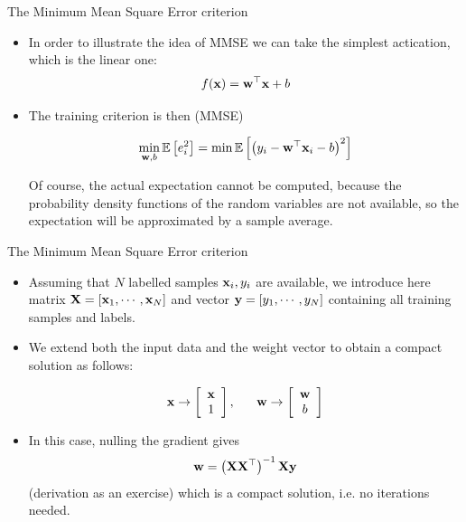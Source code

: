 \documentclass{beamer}
\begin{document}
\begin{frame}{The Minimum Mean Square Error criterion}

\begin{itemize}
    \item In order to illustrate the idea of MMSE we can take the simplest actication, which is the linear one:
    $$
    f({\bf x}) = {\bf w}^\top {\bf x} + b
    $$
    
    \item The training criterion is then (MMSE)
    
    \begin{equation}
    \min_{{\bf w}, b} \mathbb{E}\left[e_i^2\right] = \min \mathbb{E} \left[ \left( y_i - {\bf w}^\top {\bf x}_i -b \right)^2\right]
    \end{equation}

Of course, the actual expectation cannot be computed, because the probability density functions of the random variables are not available, so the expectation will be approximated by a sample average. 

\end{itemize}
\end{frame}

\begin{frame}{The Minimum Mean Square Error criterion}

\begin{itemize}
\item Assuming that $N$ labelled samples ${\bf x}_i, y_i$ are available, we introduce here matrix ${\bf X} = \left[{\bf x}_1, \cdots, {\bf x}_N\right]$ and vector ${\bf y} = \left[y_1, \cdots, y_N\right] $ containing all training samples and labels. 

\item We extend both the input data and the weight vector to obtain a compact solution as follows:

$$
{\bf x} \rightarrow \left[
\begin{array}{c}
     {\bf x}  \\
     1 
\end{array}
\right],~~~~~
{\bf w} \rightarrow \left[
\begin{array}{c}
     {\bf w}  \\
     b 
\end{array}
\right]
$$
\item In this case, nulling the gradient gives 
\begin{equation}
    {\bf w} = \left({\bf X}{\bf X}^\top\right)^{-1} {\bf X} {\bf y}
\end{equation}
 (derivation as an exercise) which is a compact solution, i.e. no iterations needed.
 \end{itemize}
 \end{frame}
\end{document}
